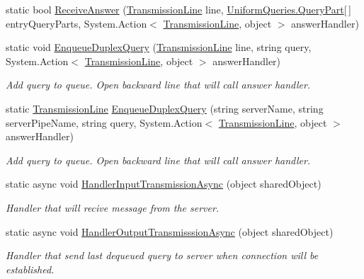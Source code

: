 \begin{DoxyCompactItemize}
\item 
static bool \mbox{\hyperlink{class_uniform_client_1_1_base_client_a4a60b1c8305032b12fd70f17ee503554}{Receive\+Answer}} (\mbox{\hyperlink{class_pipes_provider_1_1_client_1_1_transmission_line}{Transmission\+Line}} line, \mbox{\hyperlink{struct_uniform_queries_1_1_query_part}{Uniform\+Queries.\+Query\+Part}}\mbox{[}$\,$\mbox{]} entry\+Query\+Parts, System.\+Action$<$ \mbox{\hyperlink{class_pipes_provider_1_1_client_1_1_transmission_line}{Transmission\+Line}}, object $>$ answer\+Handler)
\item 
static void \mbox{\hyperlink{class_uniform_client_1_1_base_client_a5c092f6636f68caa6deb55c3c1dfa61e}{Enqueue\+Duplex\+Query}} (\mbox{\hyperlink{class_pipes_provider_1_1_client_1_1_transmission_line}{Transmission\+Line}} line, string query, System.\+Action$<$ \mbox{\hyperlink{class_pipes_provider_1_1_client_1_1_transmission_line}{Transmission\+Line}}, object $>$ answer\+Handler)
\begin{DoxyCompactList}\small\item\em Add query to queue. Open backward line that will call answer handler. \end{DoxyCompactList}\item 
static \mbox{\hyperlink{class_pipes_provider_1_1_client_1_1_transmission_line}{Transmission\+Line}} \mbox{\hyperlink{class_uniform_client_1_1_base_client_a8e4d62ab085a57e9f785ddacb44db926}{Enqueue\+Duplex\+Query}} (string server\+Name, string server\+Pipe\+Name, string query, System.\+Action$<$ \mbox{\hyperlink{class_pipes_provider_1_1_client_1_1_transmission_line}{Transmission\+Line}}, object $>$ answer\+Handler)
\begin{DoxyCompactList}\small\item\em Add query to queue. Open backward line that will call answer handler. \end{DoxyCompactList}\item 
static async void \mbox{\hyperlink{class_uniform_client_1_1_base_client_a8b0bf0f5c032239a7b1bdc73d2d5ad3d}{Handler\+Input\+Transmission\+Async}} (object shared\+Object)
\begin{DoxyCompactList}\small\item\em Handler that will recive message from the server. \end{DoxyCompactList}\item 
static async void \mbox{\hyperlink{class_uniform_client_1_1_base_client_a233b9fc7f1cdc4df399115938afd917d}{Handler\+Output\+Transmisssion\+Async}} (object shared\+Object)
\begin{DoxyCompactList}\small\item\em Handler that send last dequeued query to server when connection will be established. \end{DoxyCompactList}\end{DoxyCompactItemize}
